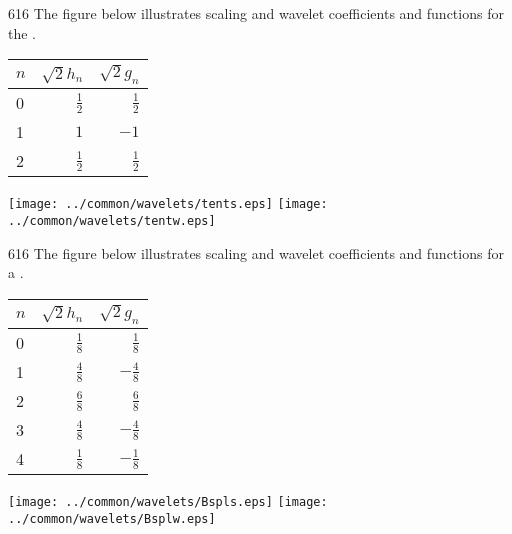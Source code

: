 \begin{example}
\citep{strang89}{616}
\label{ex:sw_gh_tent}
The figure below illustrates scaling and wavelet coefficients and functions
for the .\\
  \parbox[b][35\tw/160][c]{5\tw/16}{\begin{tabular}[b]{l|r|r}
    $n$ & $\sqrt{2} h_n $ & $\sqrt{2} g_n $ \\
    \hline
      0   & $\frac{1}{2}$  & $ \frac{1}{2}$  \\
      1   & $1$            & $-1$            \\
      2   & $\frac{1}{2}$  & $ \frac{1}{2}$
  \end{tabular}}
  \texttt{[image: ../common/wavelets/tents.eps]}
  \texttt{[image: ../common/wavelets/tentw.eps]}
\end{example}

\begin{example}
\citep{strang89}{616}
\label{ex:sw_gh_bspline}
The figure below illustrates scaling and wavelet coefficients and functions
for a .\\
  \parbox[b][35\tw/160][c]{5\tw/16}{\begin{tabular}[b]{l|r|r}
    $n$ & $\sqrt{2} h_n $ & $\sqrt{2} g_n $ \\
    \hline
      0   & $\frac{1}{8}$  & $ \frac{1}{8}$  \\
      1   & $\frac{4}{8}$  & $-\frac{4}{8}$  \\
      2   & $\frac{6}{8}$  & $ \frac{6}{8}$  \\
      3   & $\frac{4}{8}$  & $-\frac{4}{8}$  \\
      4   & $\frac{1}{8}$  & $-\frac{1}{8}$
  \end{tabular}}
  \texttt{[image: ../common/wavelets/Bspls.eps]}
  \texttt{[image: ../common/wavelets/Bsplw.eps]}
\end{example}



